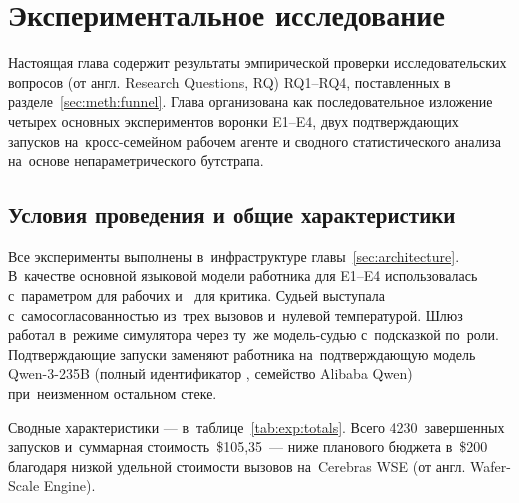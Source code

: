 
\section{Экспериментальное исследование}
\label{sec:experiments}

Настоящая глава содержит результаты эмпирической проверки
исследовательских вопросов (от англ. Research Questions, RQ)
RQ1--RQ4, поставленных в разделе~\ref{sec:meth:funnel}. Глава
организована как последовательное изложение четырех основных
экспериментов воронки E1--E4, двух подтверждающих запусков
на~кросс-семейном рабочем агенте и сводного статистического анализа
на~основе непараметрического бутстрапа.

\subsection{Условия проведения и общие характеристики}
\label{sec:exp:setup}

Все эксперименты выполнены в~инфраструктуре главы~\ref{sec:architecture}.
В~качестве основной языковой модели
работника для E1--E4 использовалась 
с~параметром  для рабочих и~
для критика. Судьей выступала 
с~самосогласованностью из~трех вызовов и~нулевой температурой.
Шлюз~ работал в~режиме симулятора через
ту~же модель-судью с~подсказкой по~роли. Подтверждающие запуски
заменяют работника на~подтверждающую модель Qwen-3-235B (полный
идентификатор ,
семейство Alibaba Qwen) при~неизменном остальном стеке.

Сводные характеристики --- в~таблице~\ref{tab:exp:totals}. Всего
4230~завершенных запусков и~суммарная стоимость~\$105{,}35~--- ниже
планового бюджета в~\$200 благодаря низкой удельной стоимости вызовов
на~Cerebras WSE (от англ. Wafer-Scale Engine).

